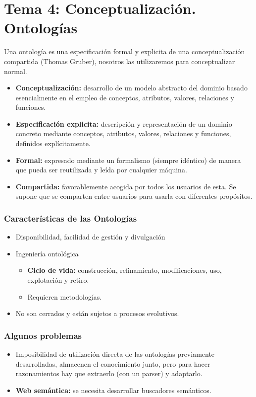 \documentclass[12pt, twoside, openright]{report} %
\begin{document}
\chapter{Tema 4: Conceptualización. Ontologías}
Una ontología es una especificación formal y explicita de una conceptualización compartida (Thomas Gruber), nosotros las utilizaremos para conceptualizar normal.
\begin{itemize}
	\item \textbf{Conceptualización:} desarrollo de un modelo abstracto del dominio basado esencialmente en el empleo de conceptos, atributos, valores, relaciones y funciones.
	\item \textbf{Especificación explicita:} descripción y representación de un dominio concreto mediante conceptos, atributos, valores, relaciones y funciones, definidos explícitamente.
	\item \textbf{Formal:} expresado mediante un formalismo (siempre idéntico) de manera que pueda ser reutilizada y leída por cualquier máquina.
	\item \textbf{Compartida:} favorablemente acogida por todos los usuarios de esta. Se supone que se comparten entre usuarios para usarla con diferentes propósitos.
\end{itemize}
\pagebreak

\subsection{Características de las Ontologías}
\begin{itemize}
	\item Disponibilidad, facilidad de gestión y divulgación
	\item Ingeniería ontológica
	      \begin{itemize}
		      \item \textbf{Ciclo de vida:} construcción, refinamiento, modificaciones, uso, explotación y retiro.
		      \item Requieren metodologías.
	      \end{itemize}
	\item No son cerrados y están sujetos a procesos evolutivos.
\end{itemize}

\subsection{Algunos problemas}
\begin{itemize}
	\item Imposibilidad de utilización directa de las ontologías previamente desarrolladas, almacenen el conocimiento junto, pero para hacer razonamientos hay que extraerlo (con un parser) y adaptarlo.
	\item \textbf{Web semántica:} se necesita desarrollar buscadores semánticos.
\end{itemize}
\end{document}
